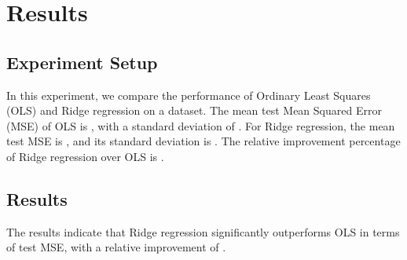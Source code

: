 \section*{Results}

\subsection*{Experiment Setup}

In this experiment, we compare the performance of Ordinary Least Squares (OLS) and Ridge regression on a dataset. The mean test Mean Squared Error (MSE) of OLS is , with a standard deviation of . For Ridge regression, the mean test MSE is , and its standard deviation is . The relative improvement percentage of Ridge regression over OLS is .

\subsection*{Results}

The results indicate that Ridge regression significantly outperforms OLS in terms of test MSE, with a relative improvement of .